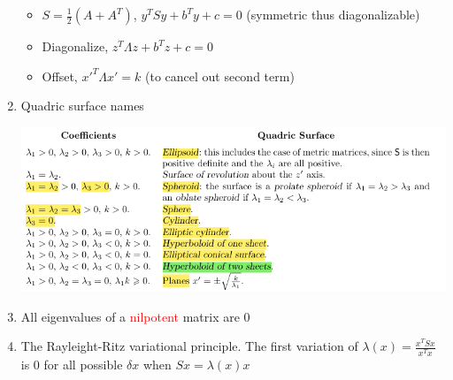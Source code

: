 \documentclass{article}
\theoremstyle{remark}
\theoremstyle{remark}
\begin{document}
\begin{enumerate}
\begin{itemize}
            \item $S=\frac{1}{2}(A+A^T)$, $y^T Sy+b^T y +c=0$ (symmetric thus diagonalizable)
            \item Diagonalize, $z^T \Lambda z+b^T z+c=0$
            \item Offset, $x'^T\Lambda x' = k$ (to cancel out second term)
        \end{itemize}
        \item Quadric surface names
        \begin{center}
            \includegraphics*[width=0.8\linewidth]{Quadric surfaces.png}
        \end{center}
        \item All eigenvalues of a \textcolor{red}{nilpotent} matrix are 0
        \item The Rayleight-Ritz variational principle. The first variation of $\lambda(x)=\frac{x^T S x}{x^T x}$ is 0 for all possible $\delta x$ when $Sx=\lambda(x)x$
    \end{enumerate}
\end{document}
